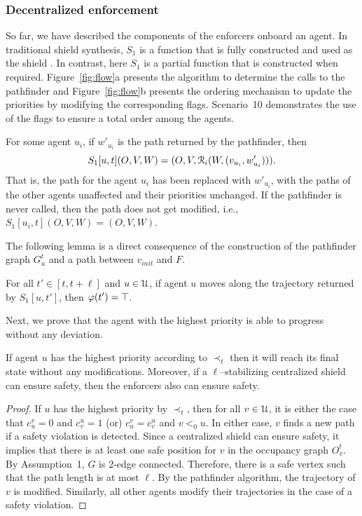 \subsubsection{Decentralized enforcement}

So far, we have described the components of the enforcers onboard an agent. In traditional shield synthesis, $S_1$ is a function that is fully constructed and used as the shield \cite{BloemKKW15}. In contrast, here $S_1$ is a partial function that is constructed when required.  Figure~\ref{fig:flow}a presents the algorithm to determine the calls to the pathfinder and Figure~\ref{fig:flow}b presents the ordering mechanism to update the priorities by modifying the corresponding flags. Scenario~10 demonstrates the use of the flags to ensure a total order among the agents.

For some agent $u_i$, if $w'_{u_i}$ is the path returned by the pathfinder, then $$S_1[u,t](O,V,W)=(O,V,\mathcal{R}_i(W,(v_{u_i},w'_{u_i}))).$$ That is, the path for the agent $u_i$ has been replaced with $w'_{u_i}$, with the paths of the other agents unaffected and their priorities unchanged.
If the pathfinder is never called, then the path does not get modified, i.e., $S_1[u_i,t](O,V,W) = (O,V,W)$.

The following lemma is a direct consequence of the construction of the pathfinder graph $G_{u}^t$ and a path between $v_{init}$ and $F$. 
\begin{lemma}
For all $t' \in [t,t+\ell]$ and $u \in \mathcal{U}$, if agent $u$ moves along the trajectory returned by $S_1[u,t']$, then $\varphi(t') = \top$.
\label{lemma:correct}
\end{lemma}
 
\noindent Next, we prove that the agent with the highest priority is able to progress without any deviation.
\begin{lemma}
If agent $u$ has the highest priority according to $\prec_t$ then it will reach its final state without any modifications. Moreover, if a $\ell$--stabilizing centralized shield can ensure safety, then the enforcers also can ensure safety.
\label{lemma:hp_lt}
\end{lemma}
\begin{proof}
If $u$ has the highest priority by $\prec_t$, then for all $v \in \mathcal{U}$, it is either the case that $c_u^v=0$ and $c_v^u=1$ (or) $c_u^v = c_v^u$ and $v <_{0} u$.
In either case, $v$ finds a new path if a safety violation is detected. Since a centralized shield can ensure safety, it implies that there is at least one safe position for $v$ in the occupancy graph $O^t_v$. By Assumption~1, $G$ is 2-edge connected. Therefore, there is a safe vertex such that the path length is at most $\ell$. By the pathfinder algorithm, the trajectory of $v$ is modified. Similarly, all other agents modify their trajectories in the case of a safety violation. 
\end{proof}

